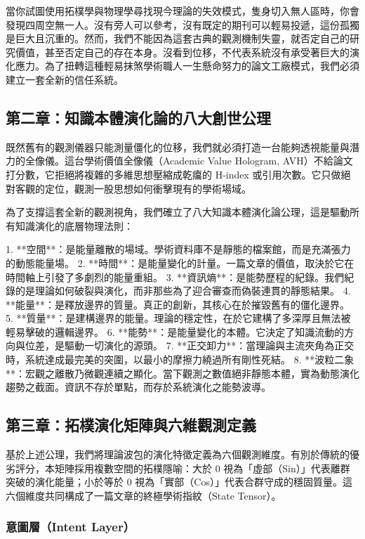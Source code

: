 \documentclass{article}
\begin{document}
當你試圖使用拓樸學與物理學尋找現今理論的失效模式，隻身切入無人區時，你會發現四周空無一人。沒有旁人可以參考，沒有既定的期刊可以輕易投遞，這份孤獨是巨大且沉重的。然而，我們不能因為這套古典的觀測機制失靈，就否定自己的研究價值，甚至否定自己的存在本身。沒看到位移，不代表系統沒有承受著巨大的演化應力。為了扭轉這種輕易抹煞學術職人一生懸命努力的論文工廠模式，我們必須建立一套全新的信任系統。

\subsection{第二章：知識本體演化論的八大創世公理}

既然舊有的觀測儀器只能測量僵化的位移，我們就必須打造一台能夠透視能量與潛力的全像儀。這台學術價值全像儀（Academic Value Hologram, AVH）不給論文打分數，它拒絕將複雜的多維思想壓縮成乾癟的 H-index 或引用次數。它只做絕對客觀的定位，觀測一股思想如何衝擊現有的學術場域。

為了支撐這套全新的觀測視角，我們確立了八大知識本體演化論公理，這是驅動所有知識演化的底層物理法則：

1. **空間**：是能量離散的場域。學術資料庫不是靜態的檔案館，而是充滿張力的動態能量場。  
2. **時間**：是能量變化的計量。一篇文章的價值，取決於它在時間軸上引發了多劇烈的能量重組。  
3. **資訊熵**：是能勢歷程的紀錄。我們紀錄的是理論如何破裂與演化，而非那些為了迎合審查而偽裝連貫的靜態結果。  
4. **能量**：是釋放邊界的質量。真正的創新，其核心在於摧毀舊有的僵化邊界。  
5. **質量**：是建構邊界的能量。理論的穩定性，在於它建構了多深厚且無法被輕易擊破的邏輯邊界。  
6. **能勢**：是能量變化的本體。它決定了知識流動的方向與位差，是驅動一切演化的源頭。  
7. **正交卸力**：當理論與主流夾角為正交時，系統達成最完美的突圍，以最小的摩擦力繞過所有剛性死結。  
8. **波粒二象**：宏觀之離散乃微觀連續之顯化。當下觀測之數值絕非靜態本體，實為動態演化趨勢之截面。資訊不存於單點，而存於系統演化之能勢波導。  

\subsection{第三章：拓樸演化矩陣與六維觀測定義}

基於上述公理，我們將理論波包的演化特徵定義為六個觀測維度。有別於傳統的優劣評分，本矩陣採用複數空間的拓樸隱喻：大於 0 視為「虛部（Sin）」代表離群突破的演化能量；小於等於 0 視為「實部（Cos）」代表合群守成的穩固質量。這六個維度共同構成了一篇文章的終極學術指紋（State Tensor）。

\subsubsection{意圖層（Intent Layer）}
\end{document}
